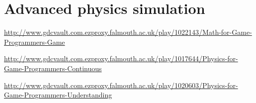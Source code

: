\part{Advanced physics simulation}
\frame{\partpage}

\begin{frame}
	\begin{center}
		\footnotesize
		\url{http://www.gdcvault.com.ezproxy.falmouth.ac.uk/play/1022143/Math-for-Game-Programmers-Game}
		
		\vspace{2ex}
		
		\url{http://www.gdcvault.com.ezproxy.falmouth.ac.uk/play/1017644/Physics-for-Game-Programmers-Continuous}

		\vspace{2ex}

		\url{http://www.gdcvault.com.ezproxy.falmouth.ac.uk/play/1020603/Physics-for-Game-Programmers-Understanding}
	\end{center}
\end{frame}
